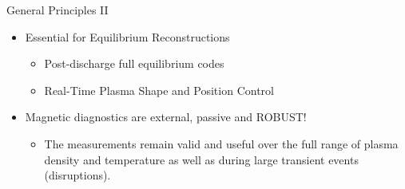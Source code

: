 \documentclass{beamer}
\begin{document}
\begin{frame}{General Principles II}%
  \begin{itemize}
  \item Essential for \alert{Equilibrium}  Reconstructions
   \begin{itemize}
		\item Post-discharge full equilibrium codes
		\item Real-Time Plasma Shape and Position Control
  \end{itemize}
  \item<2-> Magnetic diagnostics are external, passive and \alert{ ROBUST}!
   \begin{itemize}
		\item The measurements remain valid and useful over the full range of
		plasma density and temperature as well as during large transient events (disruptions).
  \end{itemize}
  \end{itemize}
\end{frame}
\end{document}
